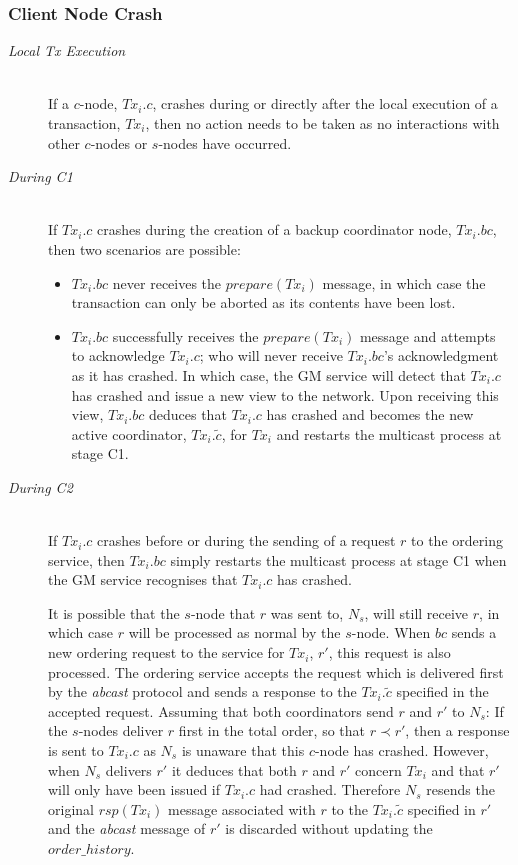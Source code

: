     \subsubsection*{Client Node Crash}
	\begin{description}
         \item[\emph{Local Tx Execution}]  \hfill \\
         If a $c$-node, $Tx_i.c$, crashes during or directly after the local execution of a transaction, $Tx_i$, then no action needs to be taken as no interactions with other $c$-nodes or $s$-nodes have occurred.  
		
		\item[\emph{During C1}]  \hfill \\
		If $Tx_i.c$ crashes during the creation of a backup coordinator node, $Tx_i.bc$, then two scenarios are possible:
		    \begin{itemize}
			    \item    $Tx_i.bc$ never receives the $prepare(Tx_i)$ message, in which case the transaction  can only be aborted as its contents have been lost.  
			    \item    $Tx_i.bc$ successfully receives the $prepare(Tx_i)$ message and attempts to acknowledge $Tx_i.c$; who will never receive $Tx_i.bc$'s acknowledgment as it has crashed.  In which case, the GM service will detect that $Tx_i.c$ has crashed and issue a new view to the network.  Upon receiving this view, $Tx_i.bc$ deduces that $Tx_i.c$ has crashed and becomes the new active coordinator, $Tx_i.\tilde{c}$, for $Tx_i$ and restarts the multicast process at stage C1.  
		    \end{itemize}     
		    
		\item[\emph{During C2}]  \hfill \\
        If $Tx_i.c$ crashes before or during the sending of a request $r$ to the ordering service, then $Tx_i.bc$ simply restarts the multicast process at stage C1 when the GM service recognises that $Tx_i.c$ has crashed.  
        
        It is possible that the $s$-node that $r$ was sent to, $N_s$, will still receive $r$, in which case $r$ will be processed as normal by the $s$-node.  When $bc$ sends a new ordering request to the service for $Tx_i$, $r'$, this request is also processed.  The ordering service accepts the request which is delivered first by the \emph{abcast} protocol and sends a response to the $Tx_i.\tilde{c}$ specified in the accepted request.  Assuming that both coordinators send $r$ and $r'$ to $N_s$: If the $s$-nodes deliver $r$ first in the total order, so that $r \prec r'$, then a response is sent to $Tx_i.c$ as $N_s$ is unaware that this $c$-node has crashed.  However, when $N_s$ delivers $r'$ it deduces that both $r$ and $r'$ concern $Tx_i$ and that $r'$ will only have been issued if $Tx_i.c$ had crashed.  Therefore $N_s$ resends the original $rsp(Tx_i)$ message associated with $r$ to the $Tx_i.\tilde{c}$ specified in $r'$ and the \emph{abcast} message of $r'$ is discarded without updating the $order\_history$.  
        

\end{description}
